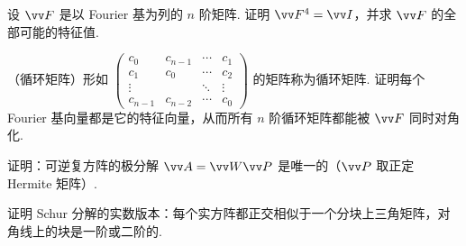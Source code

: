 {		\Cgroup
		\begin{exC}
			\item\label{ex:uni:C1} 设 $\vv F$ 是以 Fourier 基为列的 $n$ 阶矩阵. 证明 $\vv F^4=\vv I$，并求 $\vv F$ 的全部可能的特征值.
			\item\label{ex:uni:C2} （循环矩阵）形如 $\begin{pmatrix}c_0&c_{n-1}&\cdots&c_1\\c_1&c_0&\cdots&c_2\\\vdots&&\ddots&\vdots\\c_{n-1}&c_{n-2}&\cdots&c_0\end{pmatrix}$ 的矩阵称为循环矩阵. 证明每个 Fourier 基向量都是它的特征向量，从而所有 $n$ 阶循环矩阵都能被 $\vv F$ 同时对角化.
			\item\label{ex:uni:C3} 证明：可逆复方阵的极分解 $\vv A=\vv W\vv P$ 是唯一的（$\vv P$ 取正定 Hermite 矩阵）.
			\item\label{ex:uni:C4} 证明 Schur 分解的实数版本：每个实方阵都正交相似于一个分块上三角矩阵，对角线上的块是一阶或二阶的.
		\end{exC}
	}
	
